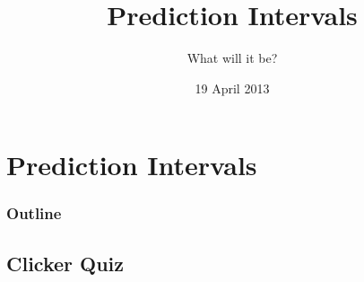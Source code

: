 
\section{Prediction Intervals}

\title{Prediction Intervals}
\subtitle{What will it be?}

\date{19 April 2013}

\begin{frame}
  \titlepage
\end{frame}

\begin{frame}
  \frametitle{Outline}
  \tableofcontents[hideothersubsections,sectionstyle=show/hide]
\end{frame}


\subsection{Clicker Quiz}


